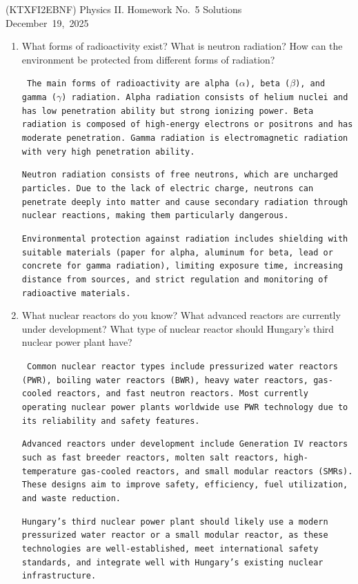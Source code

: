 \documentclass[a4paper,12pt]{letter}
\begin{document}
\begin{center}
  (KTXFI2EBNF) Physics II. Homework No.~5 Solutions\\ \smallskip
 December~19,~2025
 \end{center}

\begin{enumerate}
\item What forms of radioactivity exist? What is neutron radiation? How can the environment be protected from different forms of radiation?

 \texttt{ The main forms of radioactivity are alpha ($\alpha$), beta ($\beta$), and gamma ($\gamma$) radiation. Alpha radiation consists of helium nuclei and has low penetration ability but strong ionizing power. Beta radiation is composed of high-energy electrons or positrons and has moderate penetration. Gamma radiation is electromagnetic radiation with very high penetration ability.}
  
\texttt{Neutron radiation consists of free neutrons, which are uncharged particles. Due to the lack of electric charge, neutrons can penetrate deeply into matter and cause secondary radiation through nuclear reactions, making them particularly dangerous.}

\texttt{Environmental protection against radiation includes shielding with suitable materials (paper for alpha, aluminum for beta, lead or concrete for gamma radiation), limiting exposure time, increasing distance from sources, and strict regulation and monitoring of radioactive materials.}
  
\item What nuclear reactors do you know? What advanced reactors are currently under development? What type of nuclear reactor should Hungary’s third nuclear power plant have?

\texttt{ Common nuclear reactor types include pressurized water reactors (PWR), boiling water reactors (BWR), heavy water reactors, gas-cooled reactors, and fast neutron reactors. Most currently operating nuclear power plants worldwide use PWR technology due to its reliability and safety features.}

\texttt{Advanced reactors under development include Generation IV reactors such as fast breeder reactors, molten salt reactors, high-temperature gas-cooled reactors, and small modular reactors (SMRs). These designs aim to improve safety, efficiency, fuel utilization, and waste reduction.}

\texttt{Hungary’s third nuclear power plant should likely use a modern pressurized water reactor or a small modular reactor, as these technologies are well-established, meet international safety standards, and integrate well with Hungary’s existing nuclear infrastructure.}


\end{enumerate}
\end{document}
